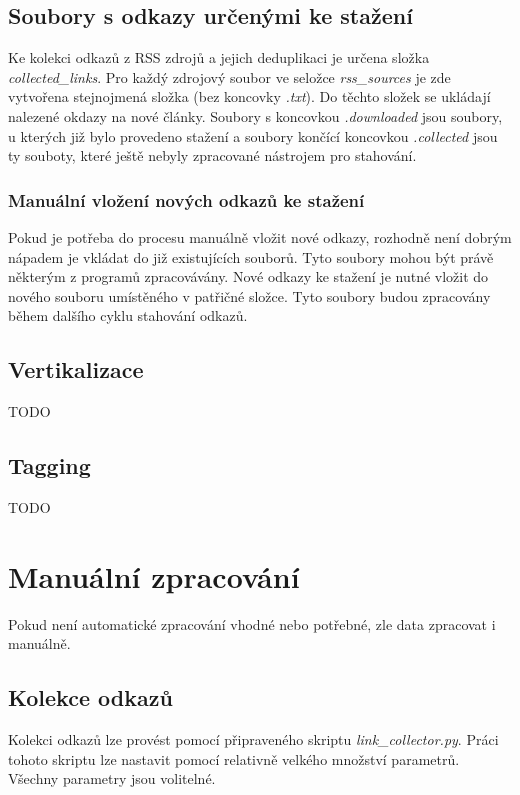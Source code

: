 \subsection{Soubory s odkazy určenými ke stažení}
Ke kolekci odkazů z RSS zdrojů a jejich deduplikaci je určena složka \textit{collected\_links}.
Pro každý zdrojový soubor ve seložce \textit{rss\_sources} je zde vytvořena stejnojmená složka (bez koncovky \textit{.txt}).
Do těchto složek se ukládají nalezené okdazy na nové články. Soubory s koncovkou \textit{.downloaded}
jsou soubory, u kterých již bylo provedeno stažení a soubory končící koncovkou \textit{.collected}
jsou ty souboty, které ještě nebyly zpracované nástrojem pro stahování.

\subsubsection{Manuální vložení nových odkazů ke stažení}
Pokud je potřeba do procesu manuálně vložit nové odkazy, rozhodně není dobrým nápadem
je vkládat do již existujících souborů. Tyto soubory mohou být právě některým z programů
zpracovávány. Nové odkazy ke stažení je nutné vložit do nového souboru
umístěného v patřičné složce. Tyto soubory budou zpracovány během dalšího cyklu stahování
odkazů.

\subsection{Vertikalizace}
TODO

\subsection{Tagging}
TODO

\section{Manuální zpracování}
Pokud není automatické zpracování vhodné nebo potřebné, zle data zpracovat i manuálně.

\subsection{Kolekce odkazů}
Kolekci odkazů lze provést pomocí připraveného skriptu \textit{link\_collector.py}.
Práci tohoto skriptu lze nastavit pomocí relativně velkého množství parametrů. Všechny
parametry jsou volitelné.

